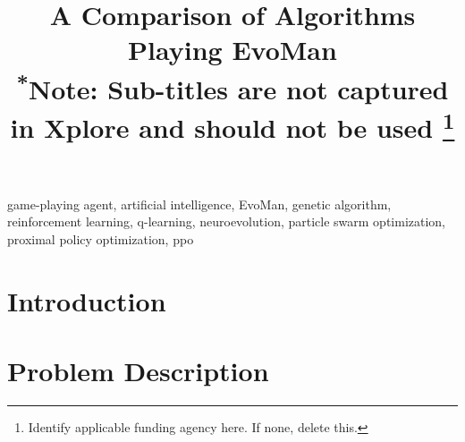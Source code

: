 \documentclass[conference]{IEEEtran}
\begin{document}
    \title{A Comparison of Algorithms Playing EvoMan\\
    {\footnotesize \textsuperscript{*}Note: Sub-titles are not captured in Xplore and
    should not be used}
        \thanks{Identify applicable funding agency here. If none, delete this.}
    }

    \author{
        \and
        \and
    }

    \maketitle

    \begin{abstract}

    \end{abstract}

    \begin{IEEEkeywords}
        game-playing agent, artificial intelligence, EvoMan, genetic algorithm, reinforcement learning,
        q-learning, neuroevolution, particle swarm optimization, proximal policy optimization, ppo
    \end{IEEEkeywords}


    \section{Introduction}\label{sec:introduction}


    \section{Problem Description}\label{sec:problem-description}
\end{document}
